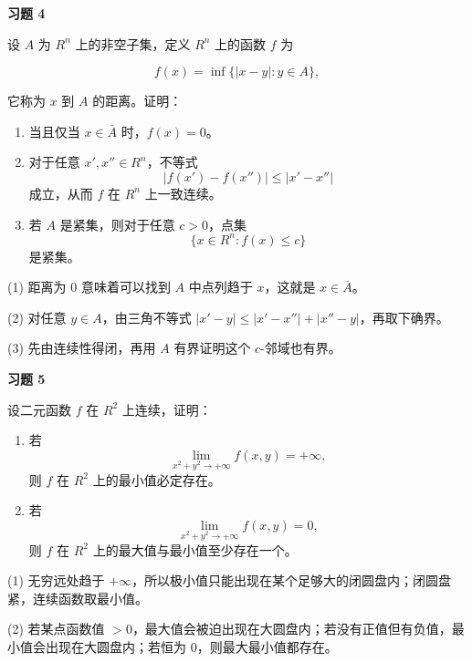 \begin{exercisebox}
\textbf{习题 4}

设 \(A\) 为 \(R^n\) 上的非空子集，定义 \(R^n\) 上的函数 \(f\) 为

\[
        f(x)=\inf\{|x-y|:y\in A\},
      \]

它称为 \(x\) 到 \(A\) 的距离。证明：

\begin{enumerate}
 \item 当且仅当 \(x\in\overline A\) 时，\(f(x)=0\)。
 \item 对于任意 \(x',x''\in R^n\)，不等式 \[
            |f(x')-f(x'')|\le |x'-x''|
          \] 成立，从而 \(f\) 在 \(R^n\) 上一致连续。
 \item 若 \(A\) 是紧集，则对于任意 \(c>0\)，点集 \[
            \{x\in R^n:f(x)\le c\}
          \] 是紧集。
 \end{enumerate}

\begin{hintbox}
(1) 距离为 0 意味着可以找到 \(A\) 中点列趋于 \(x\)，这就是 \(x\in\overline A\)。

(2) 对任意 \(y\in A\)，由三角不等式 \(|x'-y|\le |x'-x''|+|x''-y|\)，再取下确界。

(3) 先由连续性得闭，再用 \(A\) 有界证明这个 \(c\)-邻域也有界。
\end{hintbox}
\end{exercisebox}

\begin{exercisebox}
\textbf{习题 5}

设二元函数 \(f\) 在 \(R^2\) 上连续，证明：

\begin{enumerate}
 \item 若 \[
            \lim_{x^2+y^2\to+\infty}f(x,y)=+\infty,
          \] 则 \(f\) 在 \(R^2\) 上的最小值必定存在。
 \item 若 \[
            \lim_{x^2+y^2\to+\infty}f(x,y)=0,
          \] 则 \(f\) 在 \(R^2\) 上的最大值与最小值至少存在一个。
 \end{enumerate}

\begin{hintbox}
(1) 无穷远处趋于 \(+\infty\)，所以极小值只能出现在某个足够大的闭圆盘内；闭圆盘紧，连续函数取最小值。

(2) 若某点函数值 \(>0\)，最大值会被迫出现在大圆盘内；若没有正值但有负值，最小值会出现在大圆盘内；若恒为 0，则最大最小值都存在。
\end{hintbox}
\end{exercisebox}

